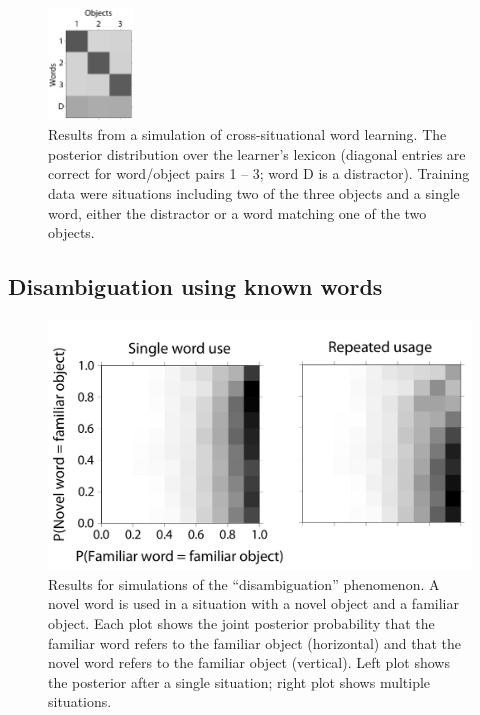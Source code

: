 \documentclass{article} %
\begin{document}
\begin{figure}
  \includegraphics[width=0.2\textwidth]{figures/cross-sit-mod.pdf}
  \caption{Results from a simulation of cross-situational word learning. The posterior distribution over the learner's lexicon (diagonal entries are correct for word/object pairs 1 -- 3; word D is a distractor). Training data were situations including two of the three objects and a single word, either the distractor or a word matching one of the two objects.}
  \label{fig:cross-sit}
\end{figure}

\subsection{Disambiguation using known words}

\begin{figure}
  \centering
\includegraphics[width=.6\textwidth]{figures/ME-composite-small.pdf}
  \caption{Results for simulations of the ``disambiguation'' phenomenon. A novel word is used in a situation with a novel object and a familiar object. Each plot shows the joint posterior probability that the familiar word refers to the familiar object (horizontal) and that the novel word refers to the familiar object (vertical). Left plot shows the posterior after a single situation; right plot shows multiple situations. 
}
  \label{fig:me}
\end{figure}
\end{document}
